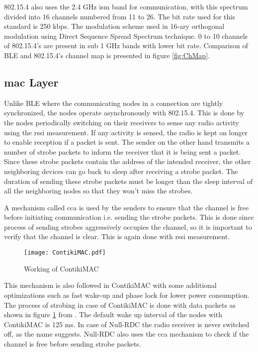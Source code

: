 802.15.4 also uses the 2.4 GHz \gls{ism} band for communication, with this spectrum divided into 16 channels numbered from 11 to 26. The bit rate used for this standard is 250 kbps. The modulation scheme used in 16-ary orthogonal modulation using Direct Sequence Spread Spectrum technique. 0 to 10 channels of 802.15.4's are present in sub 1 GHz bands with lower bit rate. Comparison of BLE and 802.15.4's channel map is presented in figure \ref{fig:ChMap}.

\subsection{\texorpdfstring{\gls{mac}}{MAC} Layer}

Unlike BLE where the communicating nodes in a connection are tightly synchronized, the nodes operate asynchronously with 802.15.4. This is done by the nodes periodically switching on their receivers to sense any radio activity using the \gls{rssi} measurement. If any activity is sensed, the radio is kept on longer to enable reception if a packet is sent. The sender on the other hand transmits a number of strobe packets to inform the receiver that it is being sent a packet. Since these strobe packets contain the address of the intended receiver, the other neighboring devices can go back to sleep after receiving a strobe packet. The duration of sending these strobe packets must be longer than the sleep interval of all the neighboring nodes so that they won't miss the strobes.

A mechanism called \gls{cca} is used by the senders to ensure that the channel is free before initiating communication i.e. sending the strobe packets. This is done since process of sending strobes aggressively occupies the channel, so it is important to verify that the channel is clear. This is again done with \gls{rssi} measurement.

\begin{figure}[h]
\centering
\texttt{[image: ContikiMAC.pdf]}
\caption{Working of ContikiMAC \cite{Dunkels2011}}
\label{fig:ContikiMAC}
\end{figure}

This mechanism is also followed in ContikiMAC with some additional optimizations such as fast wake-up and phase lock for lower power consumption. The process of strobing in case of ContikiMAC is done with data packets as shown in figure \ref{fig:ContikiMAC} from \cite{Dunkels2011}. The default wake up interval of the nodes with ContikiMAC is 125 ms. In case of Null-RDC the radio receiver is never switched off, as the name suggests. Null-RDC also uses the \gls{cca} mechanism to check if the channel is free before sending strobe packets.
